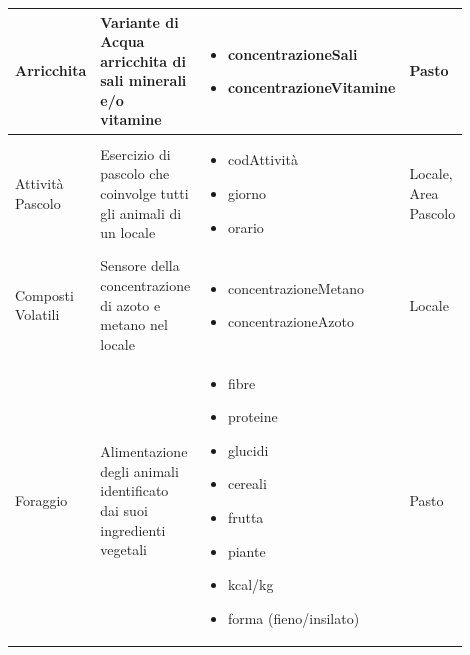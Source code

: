 \documentclass[12pt,a4paper]{article}
\begin{document}
\begin{center}
\begin{longtable}{|p{0.14\linewidth}|p{0.20\linewidth}|p{0.36\linewidth}|p{0.20\linewidth}|}
\hline
Arricchita			&  Variante di Acqua arricchita di sali minerali e/o vitamine 
					& \begin{itemize}
						\setlength{\itemindent}{-1em}
						\vspace{-25pt}
						\setlength\itemsep{-0.25em}
						\item concentrazioneSali
						\item concentrazioneVitamine
					\end{itemize}
					&  Pasto \\

\hline
Attività Pascolo 	&  Esercizio di pascolo che coinvolge tutti gli animali di un locale 
					& \begin{itemize}
						\setlength{\itemindent}{-1em}
						\vspace{-25pt}
						\setlength\itemsep{-0.25em}
						\item codAttività
						\item giorno
						\item orario
						
						
					\end{itemize}
					&  Locale, Area Pascolo \\

\hline
Composti Volatili 	&  Sensore della concentrazione di azoto e metano nel locale  
					& \begin{itemize}
						\setlength{\itemindent}{-1em}
						\vspace{-25pt}
						\setlength\itemsep{-0.25em}
						\item concentrazioneMetano
						\item concentrazioneAzoto
					\end{itemize}
					&  Locale \\

\hline
Foraggio 			&  Alimentazione degli animali identificato dai suoi ingredienti vegetali 
					& \begin{itemize}
						\setlength{\itemindent}{-1em}
						\vspace{-25pt}
						\setlength\itemsep{-0.25em}
						\item fibre
						\item proteine
						\item glucidi
						\item cereali
						\item frutta
						\item piante
						\item kcal/kg
						\item forma (fieno/insilato)
					\end{itemize}
					&  Pasto \\


\end{longtable}
\end{center}
\end{document}
